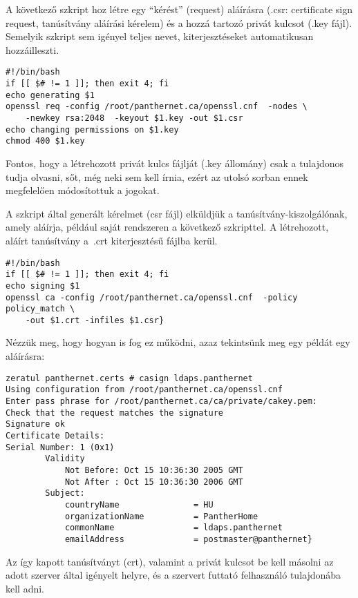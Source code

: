 \noindent A következő szkript hoz létre egy ``kérést'' (request) aláírásra (.csr: certificate
sign request, tanúsítvány aláírási kérelem) és a hozzá tartozó  privát kulcsot (.key fájl). Semelyik szkript sem igényel
teljes nevet, kiterjesztéseket automatikusan hozzáilleszti.

\begin{Verbatim}[frame=single,label=careq]
#!/bin/bash
if [[ $# != 1 ]]; then exit 4; fi
echo generating $1
openssl req -config /root/panthernet.ca/openssl.cnf  -nodes \
    -newkey rsa:2048  -keyout $1.key -out $1.csr
echo changing permissions on $1.key
chmod 400 $1.key
\end{Verbatim}

\noindent Fontos, hogy a létrehozott privát kulcs fájlját (.key állomány) csak a tulajdonos tudja olvasni, sőt, még neki
sem kell írnia, ezért az utolsó sorban ennek megfelelően módosítottuk a jogokat.

A szkript által generált kérelmet (csr fájl) elküldjük a tanúsítvány-kiszolgálónak, amely aláírja, például saját
rendszeren a következő szkripttel. A létrehozott, aláírt tanúsítvány a~.crt kiterjesztésű
fájlba kerül.

\begin{Verbatim}[frame=single,label=casign]
#!/bin/bash
if [[ $# != 1 ]]; then exit 4; fi
echo signing $1
openssl ca -config /root/panthernet.ca/openssl.cnf  -policy policy_match \
    -out $1.crt -infiles $1.csr}
\end{Verbatim}

\noindent Nézzük meg, hogy hogyan is fog ez működni, azaz tekintsünk meg egy példát egy aláírásra:

\begin{Verbatim}[frame=single]
zeratul panthernet.certs # casign ldaps.panthernet
Using configuration from /root/panthernet.ca/openssl.cnf
Enter pass phrase for /root/panthernet.ca/ca/private/cakey.pem:
Check that the request matches the signature
Signature ok
Certificate Details:
Serial Number: 1 (0x1)
        Validity
            Not Before: Oct 15 10:36:30 2005 GMT
            Not After : Oct 15 10:36:30 2006 GMT
        Subject:
            countryName               = HU
            organizationName          = PantherHome
            commonName                = ldaps.panthernet
            emailAddress              = postmaster@panthernet}

\end{Verbatim}

\noindent Az így kapott tanúsítványt (crt), valamint a privát kulcsot be kell másolni az adott szerver által igényelt
helyre, és a szervert futtató felhasználó tulajdonába kell adni.




